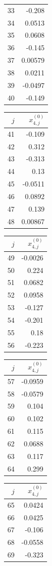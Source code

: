 {\begin{tabular}[t]{r|r}
33 & -0.208 \\
34 & 0.0513 \\
35 & 0.0608 \\
36 & -0.145 \\
37 & 0.00579 \\
38 & 0.0211 \\
39 & -0.0497 \\
40 & -0.149
\end{tabular}\kern4pt
\begin{tabular}[t]{r|r}
$j$ & $x^{(0)}_{4,j}$ \\\hline
41 & -0.109 \\
42 & 0.312 \\
43 & -0.313 \\
44 & 0.13 \\
45 & -0.0511 \\
46 & 0.0892 \\
47 & 0.139 \\
48 & 0.00867
\end{tabular}\kern4pt
\begin{tabular}[t]{r|r}
$j$ & $x^{(0)}_{4,j}$ \\\hline
49 & -0.0026 \\
50 & 0.224 \\
51 & 0.0682 \\
52 & 0.0958 \\
53 & -0.127 \\
54 & -0.201 \\
55 & 0.18 \\
56 & -0.223
\end{tabular}\kern4pt
\begin{tabular}[t]{r|r}
$j$ & $x^{(0)}_{4,j}$ \\\hline
57 & -0.0959 \\
58 & -0.0579 \\
59 & 0.104 \\
60 & 0.102 \\
61 & 0.115 \\
62 & 0.0688 \\
63 & 0.117 \\
64 & 0.299
\end{tabular}\kern4pt
\begin{tabular}[t]{r|r}
$j$ & $x^{(0)}_{4,j}$ \\\hline
65 & 0.0424 \\
66 & 0.0425 \\
67 & -0.106 \\
68 & -0.0558 \\
69 & -0.323 \\

\end{tabular}}
